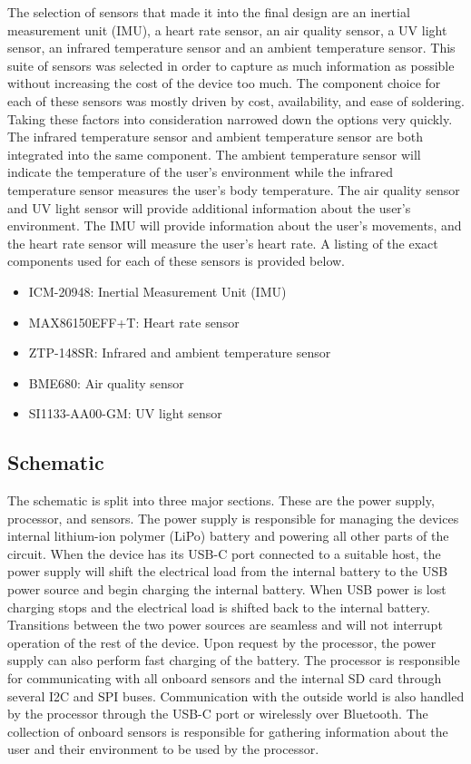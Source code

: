 The selection of sensors that made it into the final design are an inertial 
measurement unit (IMU), a heart rate sensor, an air quality sensor, a UV light 
sensor, an infrared temperature sensor and an ambient temperature sensor. This 
suite of sensors was selected in order to capture as much information as 
possible without increasing the cost of the device too much. The component 
choice for each of these sensors was mostly driven by cost, availability, and 
ease of soldering. Taking these factors into consideration narrowed down the 
options very quickly. The infrared temperature sensor and ambient temperature 
sensor are both integrated into the same component. The ambient temperature 
sensor will indicate the temperature of the user’s environment while the 
infrared temperature sensor measures the user’s body temperature. The air 
quality sensor and UV light sensor will provide additional information about 
the user’s environment. The IMU will provide information about the user’s 
movements, and the heart rate sensor will measure the user’s heart rate. A 
listing of the exact components used for each of these sensors is provided 
below.

\begin{itemize}
   \item ICM-20948: Inertial Measurement Unit (IMU)
   \item MAX86150EFF+T: Heart rate sensor
   \item ZTP-148SR: Infrared and ambient temperature sensor
   \item BME680: Air quality sensor
   \item SI1133-AA00-GM: UV light sensor
\end{itemize}

\subsection{Schematic}

The schematic is split into three major sections. These are the power supply, 
processor, and sensors. The power supply is responsible for managing the 
devices internal lithium-ion polymer (LiPo) battery and powering all other 
parts of the circuit. When the device has its USB-C port connected to a 
suitable host, the power supply will shift the electrical load from the 
internal battery to the USB power source and begin charging the internal 
battery. When USB power is lost charging stops and the electrical load is 
shifted back to the internal battery. Transitions between the two power 
sources are seamless and will not interrupt operation of the rest of the 
device. Upon request by the processor, the power supply can also perform fast 
charging of the battery. The processor is responsible for communicating with 
all onboard sensors and the internal SD card through several I2C and SPI 
buses. Communication with the outside world is also handled by the processor
through the USB-C port or wirelessly over Bluetooth. The collection of onboard 
sensors is responsible for gathering information about the user and their 
environment to be used by the processor.

